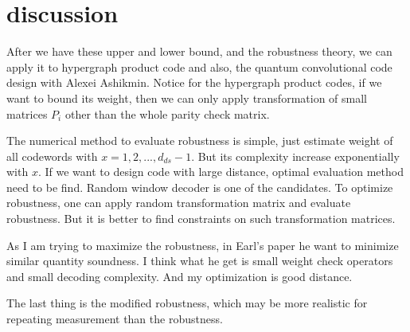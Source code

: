 \documentclass[aps,prb,12pt,tightenlines,%
notitlepage,longbibliography]{revtex4-1}
\begin{document}
\section{discussion}
After we have these upper and lower bound, and the robustness theory, we can apply it to hypergraph product code and also, the quantum convolutional code design with Alexei Ashikmin. Notice for the hypergraph product codes, if we want to bound its weight, then we can only apply transformation of small matrices $P_i$ other than the whole parity check matrix.

The numerical method to evaluate robustness is simple, just estimate weight of all codewords with $x=1,2,...,d_{ds}-1$. But its complexity increase exponentially with $x$. If we want to design code with large distance, optimal evaluation method need to be find. Random window decoder is one of the candidates. To optimize robustness, one can apply random transformation matrix and evaluate robustness. But it is better to find constraints on such transformation matrices. 

As I am trying to maximize the robustness, in Earl's paper he want to minimize similar quantity soundness. I think what he get is small weight check operators and small decoding complexity. And my optimization is good distance.

The last thing is the modified robustness, which may be more realistic for repeating measurement than the robustness.


\end{document}
